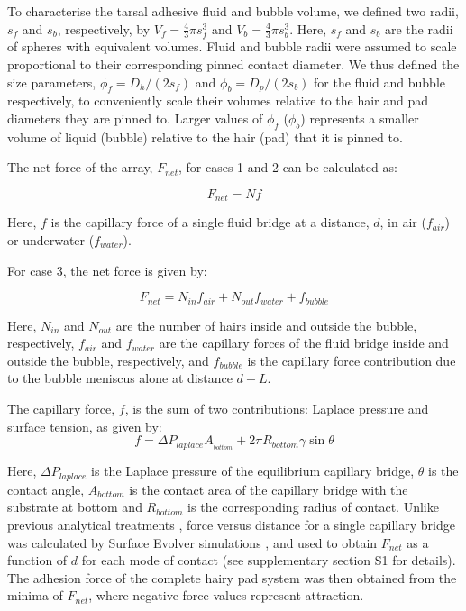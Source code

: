 \documentclass[vruler,JEB]{COB}%
\begin{document}
To characterise the tarsal adhesive fluid and bubble volume, we defined two
radii, $s_{f}$ and $s_{b}$, respectively, by $V_{f}=\frac{4}{3}\pi s_{f}^{3}$
and $V_{b}=\frac{4}{3}\pi s_{b}^{3}$. Here, $s_{f}$ and $s_{b}$
are the radii of spheres with equivalent volumes. Fluid and bubble
radii were assumed to scale proportional to their corresponding pinned
contact diameter. We thus defined the size parameters, $\phi_{f}=D_{h}/(2s_{f})$
and $\phi_{b}=D_{p}/(2s_{b})$ for the fluid and bubble
respectively, to conveniently scale their volumes relative to the
hair and pad diameters they are pinned to. Larger values of $\phi_{f}$ ($\phi_{b}$) represents a smaller volume of liquid (bubble) relative to the hair (pad) that it is pinned to.

The net force of the array, $F_{net}$, for cases 1 and 2 can be calculated as:

\begin{equation}
F_{net}=Nf\label{eq:f_air/water}
\end{equation}

Here, $f$ is the capillary force of a single fluid bridge at a distance,
$d$, in air ($f_{air}$) or underwater ($f_{water}$).

For case 3, the net force is given by:

\begin{equation}
F_{net}=N_{in}f_{air}+N_{out}f_{water}+f_{bubble}\label{eq:f_bubble}
\end{equation}

Here, $N_{in}$ and $N_{out}$ are the number of hairs inside and
outside the bubble, respectively, $f_{air}$ and $f_{water}$ are
the capillary forces of the fluid bridge inside and outside the bubble,
respectively, and $f_{bubble}$ is the capillary force contribution
due to the bubble meniscus alone at distance $d+L$. 

The capillary force, $f$, is the sum of two contributions: Laplace pressure and  surface
tension, as given by:
\begin{equation}
f=\varDelta P_{laplace}A_{_{bottom}}+2\pi R_{bottom}\gamma\sin\theta\label{eq:f_bridge}
\end{equation}

Here, $\varDelta P_{laplace}$ is the Laplace pressure of the equilibrium
capillary bridge, $\theta$ is the contact angle, $A_{bottom}$ is the contact area of the capillary
bridge with the substrate at bottom and $R_{bottom}$ is the corresponding
radius of contact. Unlike previous analytical treatments \citep{RN203, RN318}, force versus distance for a single capillary bridge was calculated by Surface
Evolver simulations \citep{RN206, RN93},
and used to obtain $F_{net}$ as a function of $d$ for each mode
of contact  (see supplementary section S1 for details). The adhesion force of the complete hairy pad system was
then obtained from the minima of $F_{net}$, where negative force
values represent attraction.
\end{document}
